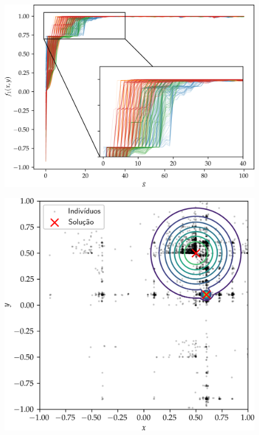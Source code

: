 \begin{frame}
  \begin{figure}
    \centering
    \includegraphics[height=0.95\textheight]{imagens/low_prob/evolution_damped_cossine.png}
  \end{figure}
\end{frame}

\begin{frame}
  \begin{figure}
    \centering
    \includegraphics[height=0.95\textheight]{imagens/low_prob/contour_near_gaussians.png}
  \end{figure}
\end{frame}

